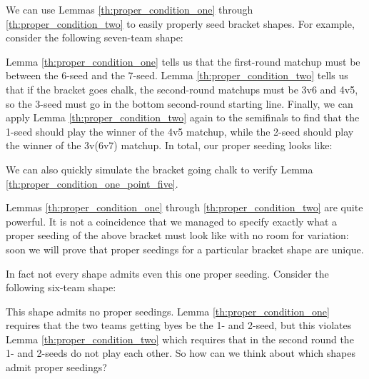 {

We can use Lemmas \ref{th:proper_condition_one} through \ref{th:proper_condition_two} to easily properly seed bracket shapes. For example, consider the following seven-team shape:


Lemma \ref{th:proper_condition_one} tells us that the first-round matchup must be between the 6-seed and the 7-seed. Lemma \ref{th:proper_condition_two} tells us that if the bracket goes chalk, the second-round matchups must be 3v6 and 4v5, so the 3-seed must go in the bottom second-round starting line. Finally, we can apply Lemma \ref{th:proper_condition_two} again to the semifinals to find that the 1-seed should play the winner of the 4v5 matchup, while the 2-seed should play the winner of the 3v(6v7) matchup. In total, our proper seeding looks like:


We can also quickly simulate the bracket going chalk to verify Lemma \ref{th:proper_condition_one_point_five}.

Lemmas \ref{th:proper_condition_one} through \ref{th:proper_condition_two} are quite powerful. It is not a coincidence that we managed to specify exactly what a proper seeding of the above bracket must look like with no room for variation: soon we will prove that proper seedings for a particular bracket shape are unique.

In fact not every shape admits even this one proper seeding. Consider the following six-team shape:


This shape admits no proper seedings. Lemma \ref{th:proper_condition_one} requires that the two teams getting byes be the 1- and 2-seed, but this violates Lemma \ref{th:proper_condition_two} which requires that in the second round the 1- and 2-seeds do not play each other. So how can we think about which shapes admit proper seedings?

}
